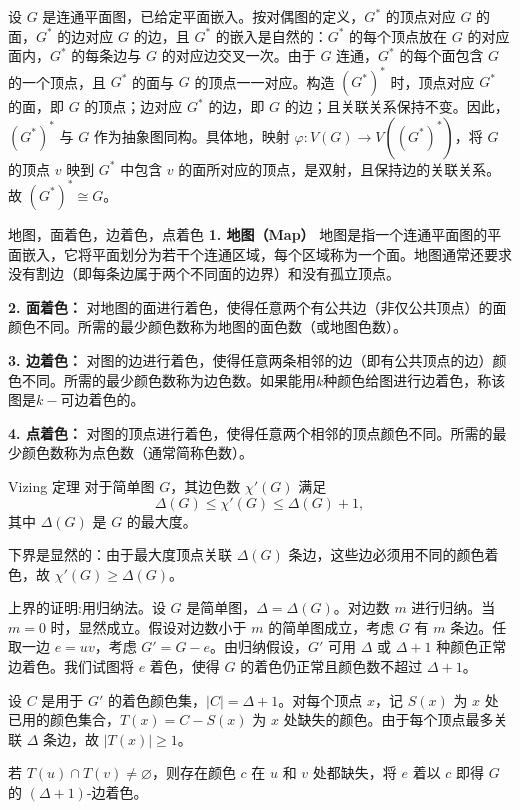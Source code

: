 设 $G$ 是连通平面图，已给定平面嵌入。按对偶图的定义，$G^*$ 的顶点对应 $G$ 的面，$G^*$ 的边对应 $G$ 的边，且 $G^*$ 的嵌入是自然的：$G^*$ 的每个顶点放在 $G$ 的对应面内，$G^*$ 的每条边与 $G$ 的对应边交叉一次。由于 $G$ 连通，$G^*$ 的每个面包含 $G$ 的一个顶点，且 $G^*$ 的面与 $G$ 的顶点一一对应。构造 $(G^*)^*$ 时，顶点对应 $G^*$ 的面，即 $G$ 的顶点；边对应 $G^*$ 的边，即 $G$ 的边；且关联关系保持不变。因此，$(G^*)^*$ 与 $G$ 作为抽象图同构。具体地，映射 $\varphi: V(G) \to V((G^*)^*)$，将 $G$ 的顶点 $v$ 映到 $G^*$ 中包含 $v$ 的面所对应的顶点，是双射，且保持边的关联关系。故 $(G^*)^* \cong G$。
\begin{definition}{地图，面着色，边着色，点着色}{}
\textbf{1. 地图（Map）}
地图是指一个连通平面图的平面嵌入，它将平面划分为若干个连通区域，每个区域称为一个面。地图通常还要求没有割边（即每条边属于两个不同面的边界）和没有孤立顶点。

\textbf{2. 面着色：}
对地图的面进行着色，使得任意两个有公共边（非仅公共顶点）的面颜色不同。所需的最少颜色数称为地图的面色数（或地图色数）。

\textbf{3. 边着色：}
对图的边进行着色，使得任意两条相邻的边（即有公共顶点的边）颜色不同。所需的最少颜色数称为边色数。如果能用$k$种颜色给图进行边着色，称该图是$k-$可边着色的。

\textbf{4. 点着色：}
对图的顶点进行着色，使得任意两个相邻的顶点颜色不同。所需的最少颜色数称为点色数（通常简称色数）。
\end{definition}
\begin{theorem}{Vizing 定理}{}
    对于简单图 $G$，其边色数 $\chi'(G)$ 满足
    \[
    \Delta(G) \le \chi'(G) \le \Delta(G) + 1,
    \]
    其中 $\Delta(G)$ 是 $G$ 的最大度。
\end{theorem}
下界是显然的：由于最大度顶点关联 $\Delta(G)$ 条边，这些边必须用不同的颜色着色，故 $\chi'(G) \ge \Delta(G)$。

    上界的证明:用归纳法。设 $G$ 是简单图，$\Delta = \Delta(G)$。对边数 $m$ 进行归纳。当 $m=0$ 时，显然成立。假设对边数小于 $m$ 的简单图成立，考虑 $G$ 有 $m$ 条边。任取一边 $e=uv$，考虑 $G' = G - e$。由归纳假设，$G'$ 可用 $\Delta$ 或 $\Delta+1$ 种颜色正常边着色。我们试图将 $e$ 着色，使得 $G$ 的着色仍正常且颜色数不超过 $\Delta+1$。

    设 $C$ 是用于 $G'$ 的着色颜色集，$|C| = \Delta+1$。对每个顶点 $x$，记 $S(x)$ 为 $x$ 处已用的颜色集合，$T(x) = C -S(x)$ 为 $x$ 处缺失的颜色。由于每个顶点最多关联 $\Delta$ 条边，故 $|T(x)| \ge 1$。

    若 $T(u) \cap T(v) \neq \varnothing$，则存在颜色 $c$ 在 $u$ 和 $v$ 处都缺失，将 $e$ 着以 $c$ 即得 $G$ 的 $(\Delta+1)$-边着色。

